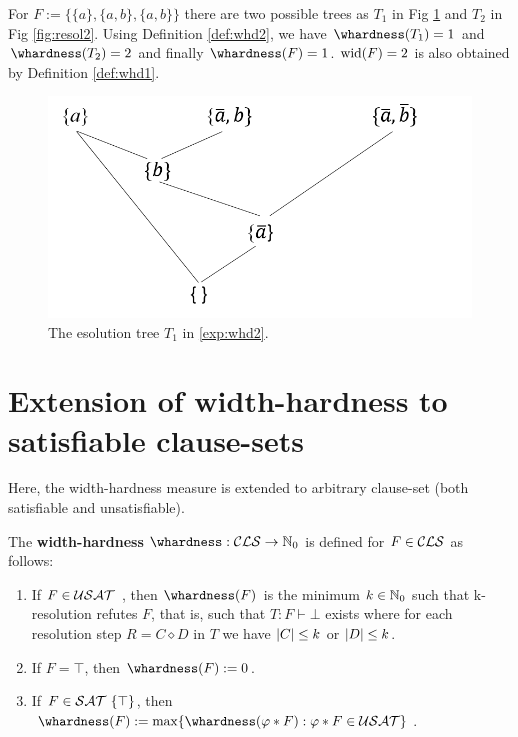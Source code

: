 \documentclass[]{book}
\begin{document}
\begin{examp}\label{exp:whd2}
      For $F := \{\{a\}, \{a, b\}, \{a, b\}\}$ there are two possible trees as $T_1$ in Fig \ref{fig:whd2} and $T_2$ in Fig \ref{fig:resol2}.   
	  Using Definition \ref{def:whd2}, we have $\whardness(T_1) = 1$ and $\whardness(T_2) = 2$ and finally $\whardness(F) = 1$. $\operatorname{wid}(F) = 2$ is also 
	  obtained by Definition \ref{def:whd1}.
	  \begin{figure}
      \begin{center}
      \includegraphics[scale =0.6]{whd1.png}
      \caption{The esolution tree $T_1$ in \ref{exp:whd2}.}
	  \label{fig:whd2}
      \end{center}
      \end{figure}
\end{examp}
\section{Extension of width-hardness to satisfiable clause-sets}
\label{sec:extensionWidth-hardness}
Here, the width-hardness measure is extended to arbitrary clause-set (both satisfiable and unsatisfiable). 

\begin{defi}\label{def:ex-whd}  
      \cite{h11} The \textbf{width-hardness} $\whardness : \Cls \rightarrow \NNZ$  is defined for $F \in \mathcal{CLS}$ as follows:
	  \begin{enumerate}
              \item If $F \in \mathcal{USAT}$ , then $\whardness(F)$ is the minimum $k \in \mathbb{N}_0$ such that k-resolution refutes $F$, that is, such that
			  $T : F \vdash \bot$ exists where for each resolution step $R = C  \diamond D$ in $T$ we have $ \lvert C  \rvert \le k$ or $\lvert D  \rvert \le k$.
			  \item If $F = \top$, then $\whardness(F) := 0$.
			  \item If $F \in \mathcal{SAT} \ \{ \top \}$, then $\whardness(F) := \max \{\whardness(\varphi * F) : \varphi * F \in \Usat\}$.
      \end{enumerate}
\end{defi}
\end{document}
